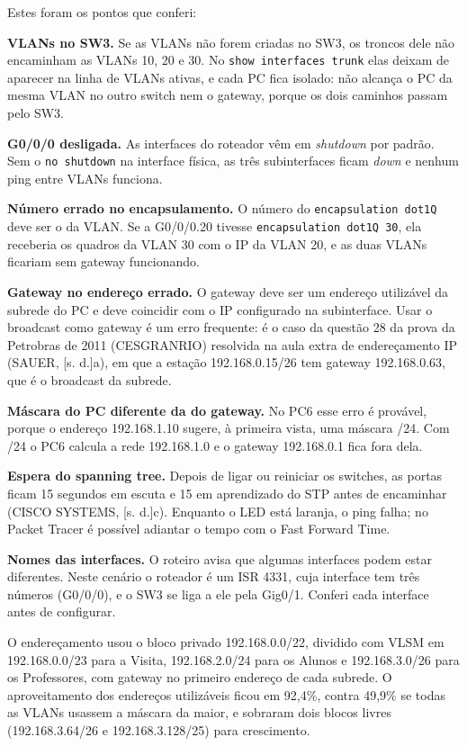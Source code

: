 Estes foram os pontos que conferi:

\textbf{VLANs no SW3.} Se as VLANs não forem criadas no SW3, os troncos dele não encaminham as VLANs 10, 20 e 30. No \texttt{show interfaces trunk} elas deixam de aparecer na linha de VLANs ativas, e cada PC fica isolado: não alcança o PC da mesma VLAN no outro switch nem o gateway, porque os dois caminhos passam pelo SW3.

\textbf{G0/0/0 desligada.} As interfaces do roteador vêm em \emph{shutdown} por padrão. Sem o \texttt{no shutdown} na interface física, as três subinterfaces ficam \emph{down} e nenhum ping entre VLANs funciona.

\textbf{Número errado no encapsulamento.} O número do \texttt{encapsulation dot1Q} deve ser o da VLAN. Se a G0/0/0.20 tivesse \texttt{encapsulation dot1Q 30}, ela receberia os quadros da VLAN 30 com o IP da VLAN 20, e as duas VLANs ficariam sem gateway funcionando.

\textbf{Gateway no endereço errado.} O gateway deve ser um endereço utilizável da subrede do PC e deve coincidir com o IP configurado na subinterface. Usar o broadcast como gateway é um erro frequente: é o caso da questão 28 da prova da Petrobras de 2011 (CESGRANRIO) resolvida na aula extra de endereçamento IP (SAUER, [s. d.]a), em que a estação 192.168.0.15/26 tem gateway 192.168.0.63, que é o broadcast da subrede.

\textbf{Máscara do PC diferente da do gateway.} No PC6 esse erro é provável, porque o endereço 192.168.1.10 sugere, à primeira vista, uma máscara /24. Com /24 o PC6 calcula a rede 192.168.1.0 e o gateway 192.168.0.1 fica fora dela.

\textbf{Espera do spanning tree.} Depois de ligar ou reiniciar os switches, as portas ficam 15 segundos em escuta e 15 em aprendizado do STP antes de encaminhar (CISCO SYSTEMS, [s. d.]c). Enquanto o LED está laranja, o ping falha; no Packet Tracer é possível adiantar o tempo com o Fast Forward Time.

\textbf{Nomes das interfaces.} O roteiro avisa que algumas interfaces podem estar diferentes. Neste cenário o roteador é um ISR 4331, cuja interface tem três números (G0/0/0), e o SW3 se liga a ele pela Gig0/1. Conferi cada interface antes de configurar.


O endereçamento usou o bloco privado 192.168.0.0/22, dividido com VLSM em 192.168.0.0/23 para a Visita, 192.168.2.0/24 para os Alunos e 192.168.3.0/26 para os Professores, com gateway no primeiro endereço de cada subrede. O aproveitamento dos endereços utilizáveis ficou em 92,4\%, contra 49,9\% se todas as VLANs usassem a máscara da maior, e sobraram dois blocos livres (192.168.3.64/26 e 192.168.3.128/25) para crescimento.

